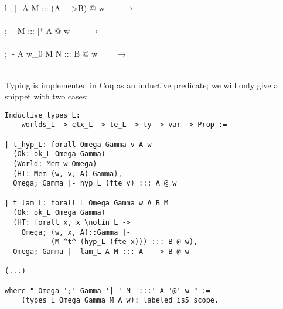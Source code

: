 \begin{center}
\footnotesize
\begin{spacing}{3}
\begin{tabular} { l }
			    {\Omega; \Gamma |-  A M ::: (A --->B) @ w} ~~~ $\rightarrow$\\
\\[0.5cm]

			     {\Omega; \Gamma |-  M ::: [*]A @ w} ~~~ $\rightarrow$\\
 \\[0.8cm]

	{\Omega; \Gamma |-  A {w_0} M N ::: B @ w} ~~~ $\rightarrow$\\

 \\
\end{tabular}
\end{spacing}
\normalsize
\end{center}

Typing is implemented in Coq as an inductive predicate; we will only give a snippet with two cases:
\begin{verbatim}
Inductive types_L: 
    worlds_L -> ctx_L -> te_L -> ty -> var -> Prop :=

| t_hyp_L: forall Omega Gamma v A w
  (Ok: ok_L Omega Gamma)
  (World: Mem w Omega)
  (HT: Mem (w, v, A) Gamma),
  Omega; Gamma |- hyp_L (fte v) ::: A @ w

| t_lam_L: forall L Omega Gamma w A B M
  (Ok: ok_L Omega Gamma)
  (HT: forall x, x \notin L ->
    Omega; (w, x, A)::Gamma |- 
           (M ^t^ (hyp_L (fte x))) ::: B @ w),
  Omega; Gamma |- lam_L A M ::: A ---> B @ w

(...)

where " Omega ';' Gamma '|-' M ':::' A '@' w " := 
    (types_L Omega Gamma M A w): labeled_is5_scope.
\end{verbatim}

